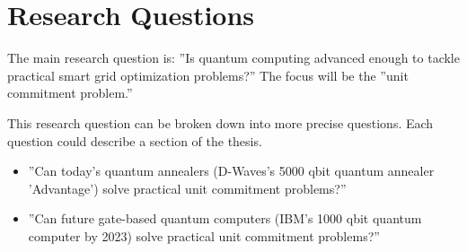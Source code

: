 \section{Research Questions}

The main research question is:
''Is quantum computing advanced enough to tackle practical
smart grid optimization problems?''
The focus will be the ''unit commitment problem.''

This research question can be broken down into more precise questions.
Each question could describe a section of the thesis.
\begin{itemize}
  \item ''Can today's quantum annealers (D-Waves's 5000 qbit quantum annealer 'Advantage') solve practical unit commitment problems?''
  \item ''Can future gate-based quantum computers (IBM's 1000 qbit quantum computer by 2023) solve practical unit commitment problems?''
\end{itemize}